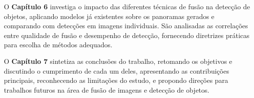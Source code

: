 O \textbf{Capítulo 6} investiga o impacto das diferentes técnicas de fusão na detecção de objetos, aplicando modelos já existentes sobre os panoramas gerados e comparando com detecções em imagens individuais. São analisadas as correlações entre qualidade de fusão e desempenho de detecção, fornecendo diretrizes práticas para escolha de métodos adequados.

O \textbf{Capítulo 7} sintetiza as conclusões do trabalho, retomando os objetivos e discutindo o cumprimento de cada um deles, apresentando as contribuições principais, reconhecendo as limitações do estudo, e propondo direções para trabalhos futuros na área de fusão de imagens e detecção de objetos.

